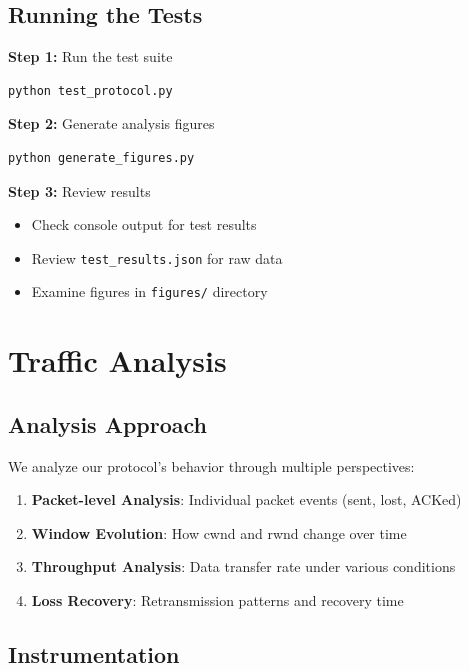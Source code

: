 \documentclass[11pt,a4paper]{article}
\begin{document}
\subsection{Running the Tests}

\textbf{Step 1:} Run the test suite
\begin{lstlisting}[language=bash]
python test_protocol.py
\end{lstlisting}

\textbf{Step 2:} Generate analysis figures
\begin{lstlisting}[language=bash]
python generate_figures.py
\end{lstlisting}

\textbf{Step 3:} Review results
\begin{itemize}
    \item Check console output for test results
    \item Review \texttt{test\_results.json} for raw data
    \item Examine figures in \texttt{figures/} directory
\end{itemize}

\section{Traffic Analysis}

\subsection{Analysis Approach}

We analyze our protocol's behavior through multiple perspectives:

\begin{enumerate}
    \item \textbf{Packet-level Analysis}: Individual packet events (sent, lost, ACKed)
    \item \textbf{Window Evolution}: How cwnd and rwnd change over time
    \item \textbf{Throughput Analysis}: Data transfer rate under various conditions
    \item \textbf{Loss Recovery}: Retransmission patterns and recovery time
\end{enumerate}

\subsection{Instrumentation}
\end{document}
